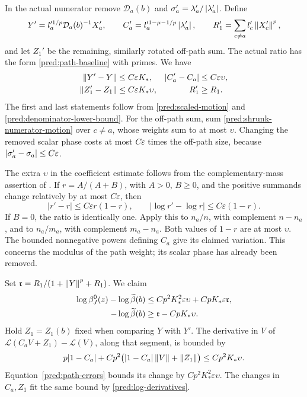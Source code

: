 In the actual numerator remove \(\mathcal D_a(b)\) and
\(\sigma_a'=\lambda_a'/\left|\lambda_a'\right|\). Define
\[
 Y'=l_a'^{1/p}\mathcal D_a(b)^{-1}X_a',\qquad
 C_a'=l_a'^{1-\mu-1/p}\left|\lambda_a'\right|,\qquad
 R_1'=\sum_{c\ne a}l_c'\left\|X_c'\right\|^p,
\]
and let \(Z_1'\) be the remaining, similarly rotated off-path sum.
The actual ratio has the form \eqref{pred:path-baseline} with primes.
We have
\begin{align}
 \left\|Y'-Y\right\|&\le C\varepsilon K_*,
 &\left|C_a'-C_a\right|&\le C\varepsilon\upsilon,\notag\\
 \left\|Z_1'-Z_1\right\|&\le C\varepsilon K_*\upsilon,
 &R_1'&\ge R_1.
 \label{pred:path-errors}
\end{align}
The first and last statements follow from
\eqref{pred:scaled-motion} and \eqref{pred:denominator-lower-bound}.
For the off-path sum, sum \eqref{pred:shrunk-numerator-motion} over
\(c\ne a\), whose weights sum to at most \(\upsilon\).
Changing the removed scalar phase costs at most \(C\varepsilon\)
times the off-path size, because
\(\left|\sigma_a'-\sigma_a\right|\le C\varepsilon\).

The extra \(\upsilon\) in the coefficient estimate follows from the
complementary-mass assertion of .
If \(r=A/(A+B)\), with \(A>0\), \(B\ge0\), and the positive
summands change relatively by at most \(C\varepsilon\), then
\[
 |r'-r|\le C\varepsilon r(1-r),\qquad
 |\log r'-\log r|\le C\varepsilon(1-r).
\]
If \(B=0\), the ratio is identically one.
Apply this to \(n_a/n\), with complement \(n-n_a\), and to
\(n_a/m_a\), with complement \(m_a-n_a\).
Both values of \(1-r\) are at most \(\upsilon\).
The bounded nonnegative powers defining \(C_a\) give its claimed
variation. This concerns the modulus of the path weight; its scalar
phase has already been removed.

Set \(\mathfrak r=R_1/(1+\left\|Y\right\|^p+R_1)\). We claim
\begin{align}
 \log\beta_J^0(z)-\log\widetilde\beta(b)
    &\le C p^2K_*^2\varepsilon\upsilon
           +C pK_*\varepsilon\mathfrak r,\notag\\
 -\log\widetilde\beta(b)
    &\ge \mathfrak r-CpK_*\upsilon.
 \label{eq:src-26}
\end{align}
Hold \(Z_1=Z_1(b)\) fixed when comparing \(Y\) with \(Y'\).
The derivative in \(V\) of
\(\mathcal L(C_aV+Z_1)-\mathcal L(V)\), along that segment, is bounded by
\[
 p|1-C_a|+Cp^2\bigl(|1-C_a|\left\|V\right\|+\left\|Z_1\right\|\bigr)
       \le Cp^2K_*\upsilon.
\]
Equation~\eqref{pred:path-errors} bounds its change by
\(Cp^2K_*^2\varepsilon\upsilon\).
The changes in \(C_a,Z_1\) fit the same bound by
\eqref{pred:log-derivatives}.

